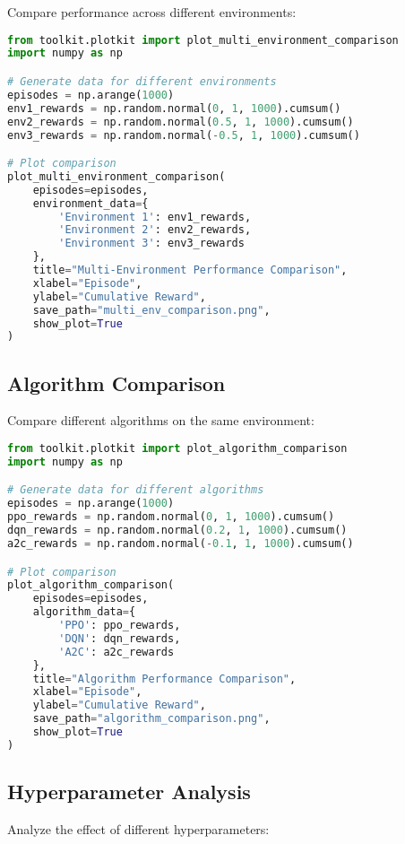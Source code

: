 Compare performance across different environments:

\begin{lstlisting}[language=python, caption=Multi-Environment Comparison]
from toolkit.plotkit import plot_multi_environment_comparison
import numpy as np

# Generate data for different environments
episodes = np.arange(1000)
env1_rewards = np.random.normal(0, 1, 1000).cumsum()
env2_rewards = np.random.normal(0.5, 1, 1000).cumsum()
env3_rewards = np.random.normal(-0.5, 1, 1000).cumsum()

# Plot comparison
plot_multi_environment_comparison(
    episodes=episodes,
    environment_data={
        'Environment 1': env1_rewards,
        'Environment 2': env2_rewards,
        'Environment 3': env3_rewards
    },
    title="Multi-Environment Performance Comparison",
    xlabel="Episode",
    ylabel="Cumulative Reward",
    save_path="multi_env_comparison.png",
    show_plot=True
)
\end{lstlisting}

\subsection{Algorithm Comparison}

Compare different algorithms on the same environment:

\begin{lstlisting}[language=python, caption=Algorithm Comparison]
from toolkit.plotkit import plot_algorithm_comparison
import numpy as np

# Generate data for different algorithms
episodes = np.arange(1000)
ppo_rewards = np.random.normal(0, 1, 1000).cumsum()
dqn_rewards = np.random.normal(0.2, 1, 1000).cumsum()
a2c_rewards = np.random.normal(-0.1, 1, 1000).cumsum()

# Plot comparison
plot_algorithm_comparison(
    episodes=episodes,
    algorithm_data={
        'PPO': ppo_rewards,
        'DQN': dqn_rewards,
        'A2C': a2c_rewards
    },
    title="Algorithm Performance Comparison",
    xlabel="Episode",
    ylabel="Cumulative Reward",
    save_path="algorithm_comparison.png",
    show_plot=True
)
\end{lstlisting}

\subsection{Hyperparameter Analysis}

Analyze the effect of different hyperparameters:

